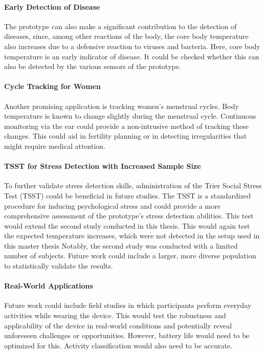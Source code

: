 \paragraph{Early Detection of Disease}
The prototype can also make a significant contribution to the detection of diseases, since, among other reactions of the body, the core body temperature also increases due to a defensive reaction to viruses and bacteria. Here, core body temperature is an early indicator of disease.
It could be checked whether this can also be detected by the various sensors of the prototype.

\paragraph{Cycle Tracking for Women}
Another promising application is tracking women's menstrual cycles. 
Body temperature is known to change slightly during the menstrual cycle.
Continuous monitoring via the ear could provide a non-intrusive method of tracking these changes. 
This could aid in fertility planning or in detecting irregularities that might require medical attention.

\paragraph{TSST for Stress Detection with Increased Sample Size}
To further validate stress detection skills, administration of the Trier Social Stress Test (TSST) could be beneficial in future studies. 
The TSST is a standardized procedure for inducing psychological stress and could provide a more comprehensive assessment of the prototype's stress detection abilities. 
This test would extend the second study conducted in this thesis.
This would again test the expected temperature increases, which were not detected in the setup used in this master thesis
Notably, the second study was conducted with a limited number of subjects. 
Future work could include a larger, more diverse population to statistically validate the results.

\paragraph{Real-World Applications}
Future work could include field studies in which participants perform everyday activities while wearing the device. 
This would test the robustness and applicability of the device in real-world conditions and potentially reveal unforeseen challenges or opportunities.
However, battery life would need to be optimized for this.
Activity classification would also need to be accurate.

